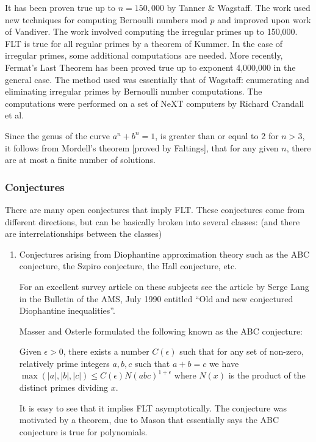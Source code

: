 {    It has been proven true up to $n = 150,000$ by Tanner \& Wagstaff. The
    work used new techniques for computing Bernoulli numbers mod $p$ and
    improved upon work of Vandiver. The work involved computing the
    irregular primes up to 150,000. FLT is true for all regular primes
    by a theorem of Kummer. In the case of irregular primes, some
    additional computations are needed. More recently, 
    Fermat's Last Theorem has been proved true up to exponent 4,000,000
    in the general case. The method used was essentially that of Wagstaff:
    enumerating and eliminating irregular primes by Bernoulli number
    computations. The computations were performed on a set of NeXT
    computers by Richard Crandall et al.

    Since the genus of the curve $a^n + b^n = 1$, is greater than or equal
    to 2 for $n > 3$, it follows from Mordell's theorem [proved by
    Faltings], that for any given $n$, there are at most a finite number
    of solutions.


    \subsubsection{Conjectures}

    There are many open conjectures that imply FLT. These conjectures
    come from different directions, but can be basically broken into
    several classes: (and there are interrelationships between the
    classes)
\begin{enumerate}

    \item Conjectures arising from Diophantine approximation theory such
    as the ABC conjecture, the Szpiro conjecture, the Hall conjecture,
    etc.

    For an excellent survey article on these subjects see the article
    by Serge Lang in the Bulletin of the AMS, July 1990 entitled
    ``Old and new conjectured Diophantine inequalities''.

    Masser and Osterle formulated the following known as the ABC
    conjecture:

    Given $\epsilon > 0$, there exists a number $C(\epsilon)$ such that for
    any set of non-zero, relatively prime integers $a,b,c$ such that
    $a+b = c$ we have
    $\max( |a|, |b|, |c|) \leq C(\epsilon) N(abc)^{1 + \epsilon}$
    where $N(x)$ is the product of the distinct primes dividing $x$.

    It is easy to see that it implies FLT asymptotically. The conjecture
    was motivated by a theorem, due to Mason that essentially says the
    ABC conjecture is true for polynomials.


\end{enumerate}}

